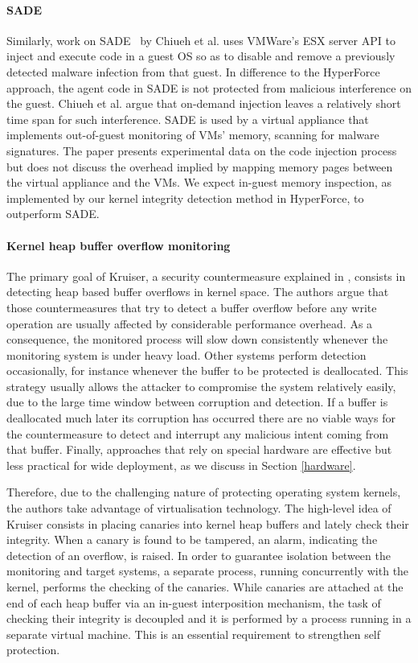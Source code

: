 \paragraph{SADE}
Similarly, work on SADE~\cite{chiueh:sade} by Chiueh et al. uses VMWare's ESX server 
API to inject and execute code in a guest OS so as to disable and remove a previously 
detected malware infection from that guest. In difference to the HyperForce approach, 
the agent code in SADE is not protected from malicious interference on the guest. 
Chiueh et al. argue that on-demand injection leaves a relatively short time span for 
such interference. SADE is used by a virtual appliance that implements out-of-guest 
monitoring of VMs' memory, scanning for malware signatures.
The paper presents experimental data on the code injection process but does not discuss 
the overhead implied by mapping memory pages between the virtual appliance and the VMs. 
We expect in-guest memory inspection, as implemented by our kernel integrity detection 
method in HyperForce, to outperform SADE.


\paragraph{Kernel heap buffer overflow monitoring}
The primary goal of Kruiser, a security countermeasure explained in \cite{heapoverflow}, consists in detecting heap based buffer overflows in kernel space. The authors argue that those countermeasures that try to detect a buffer overflow before any write operation are usually affected by considerable performance overhead. As a consequence, the monitored process will slow down consistently whenever the monitoring system is under heavy load. Other systems perform detection occasionally, for instance whenever the buffer to be protected is deallocated. This strategy usually allows the attacker to compromise the system relatively easily, due to the large time window between corruption and detection. If a buffer is deallocated much later its corruption has occurred there are no viable ways for the countermeasure to detect and interrupt any malicious intent coming from that buffer. Finally, approaches that rely on special hardware are effective but less practical for wide deployment, as we discuss in Section \ref{hardware}.

Therefore, due to the challenging nature of protecting operating system kernels, the authors take advantage of virtualisation technology.  
The high-level idea of Kruiser consists in placing canaries into kernel heap buffers and lately check their integrity. When a canary is found to be tampered, an alarm, indicating the detection of an overflow, is raised.
In order to guarantee isolation between the monitoring and target systems, a separate process, running concurrently with the kernel, performs the checking of the canaries. 
While canaries are attached at the end of each heap buffer via an in-guest interposition mechanism, the task of  checking their integrity is decoupled and it is performed by a process running in a separate virtual machine.  
This is an essential requirement to strengthen self protection.

